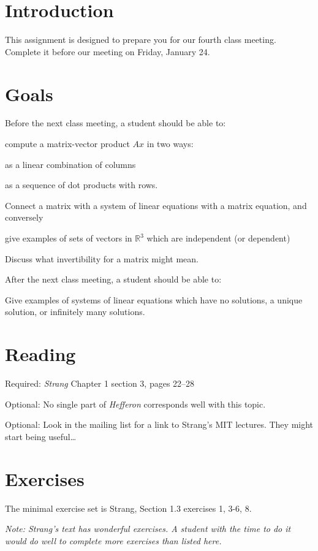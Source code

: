 \documentclass[12pt,letterpaper]{article}
\theoremstyle{definition}
\begin{document}
\setlength{\parskip}{1ex plus 0.5ex minus 0.2ex}
\setlength{\parindent}{0pt}

\pagestyle{fancy}
\cfoot{}

\section*{Introduction}
This assignment is designed to prepare you for our fourth class meeting.  Complete it before our meeting on Friday, January 24.

\section*{Goals}
Before the next class meeting, a student should be able to:
\begin{compactitem}
\item compute a matrix-vector product $Ax$ in two ways:
\begin{compactitem}
\item as a linear combination of columns
\item as a sequence of dot products with rows.
\end{compactitem}
\item Connect a matrix with a system of linear equations with a matrix equation, and conversely
\item give examples of sets of vectors in $\mathbb{R}^3$ which are independent (or dependent)
\item Discuss what invertibility for a matrix might mean.
\end{compactitem}
After the next class meeting, a student should be able to:
\begin{compactitem}
\item Give examples of systems of linear equations which have no solutions, a unique solution, or infinitely many solutions.
\end{compactitem}

\section*{Reading}
\begin{compactdesc}
\item[Required:] \emph{Strang} Chapter 1 section 3, pages 22--28
\item[Optional:] No single part of \emph{Hefferon} corresponds well with this topic.
\item[Optional:] Look in the mailing list for a link to Strang's MIT lectures.  They might start being useful\dots
\end{compactdesc}

\section*{Exercises}
The minimal exercise set is Strang, Section 1.3 exercises 1, 3-6, 8.

\emph{Note: Strang's text has wonderful exercises. A student with the time to do it would do well to complete more exercises than listed here.}


\end{document}
